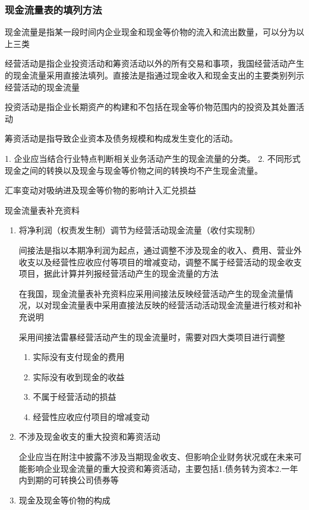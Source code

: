 \documentclass[UTF8,12pt]{ctexart}
\numberwithin{equation}{section} %
\numberwithin{figure}{section}
\numberwithin{table}{section}
\begin{document}
	\subsubsection{现金流量表的填列方法}
	现金流量是指某一段时间内企业现金和现金等价物的流入和流出数量，可以分为以上三类
	
	经营活动是指企业投资活动和筹资活动以外的所有交易和事项，我国经营活动产生的现金流量采用直接法填列。直接法是指通过现金收入和现金支出的主要类别列示经营活动的现金流量
	
	投资活动是指企业长期资产的构建和不包括在现金等价物范围内的投资及其处置活动
	
	筹资活动是指导致企业资本及债务规模和构成发生变化的活动。
	
	1.	企业应当结合行业特点判断相关业务活动产生的现金流量的分类。
	2.	不同形式现金之间的转换以及现金与现金等价物之间的转换均不产生现金流量。
	
	汇率变动对吸纳进及现金等价物的影响计入汇兑损益
	
	现金流量表补充资料
	\begin{enumerate}
		\item 将净利润（权责发生制）调节为经营活动现金流量（收付实现制）
		
		间接法是指以本期净利润为起点，通过调整不涉及现金的收入、费用、营业外收支以及经营性应收应付等项目的增减变动，调整不属于经营活动的现金收支项目，据此计算并列报经营活动产生的现金流量的方法
		
		在我国，现金流量表补充资料应采用间接法反映经营活动产生的现金流量情况，以对现金流量表中采用直接法反映的经营活动活动现金流量进行核对和补充说明
		
		采用间接法雷暴经营活动产生的现金流量时，需要对四大类项目进行调整
		\begin{enumerate}
			\item 实际没有支付现金的费用
			
			\item 实际没有收到现金的收益
			
			\item 不属于经营活动的损益
			
			\item 经营性应收应付项目的增减变动
		\end{enumerate}
		
		\item 不涉及现金收支的重大投资和筹资活动
		
		企业应当在附注中披露不涉及当期现金收支、但影响企业财务状况或在未来可能影响企业现金流量的重大投资和筹资活动，主要包括1.债务转为资本2.一年内到期的可转换公司债券等
		
		\item 现金及现金等价物的构成
	\end{enumerate}
\end{document}

